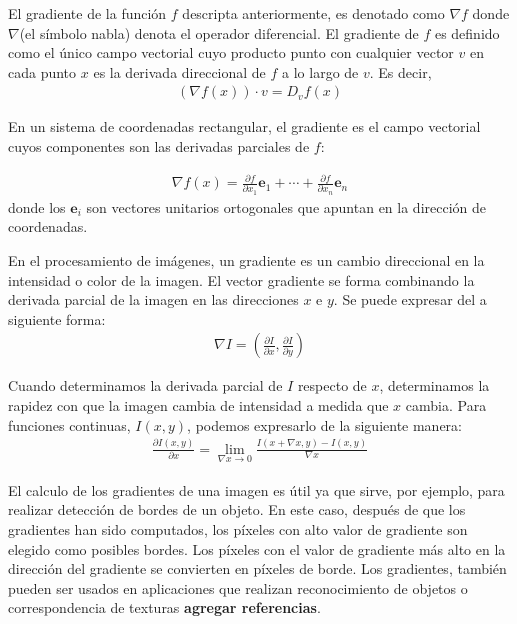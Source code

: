 	El gradiente de la función $f$ descripta anteriormente, es denotado como $\nabla f$ donde $\nabla$(el símbolo nabla) denota el operador diferencial. El gradiente de $f$ es definido como el único campo vectorial cuyo producto punto con cualquier vector $v$ en cada punto $x$ es la derivada direccional de $f$ a lo largo de $v$. Es decir,
		 \begin{align*}
		 	(\nabla f(x))\cdot v = D_v f(x)
		 \end{align*}
		 
	En un sistema de coordenadas rectangular, el gradiente es el campo vectorial cuyos componentes son las derivadas parciales de $f$:
		 
		 \begin{align*}
		 	\nabla f(x) = \frac{\partial f}{\partial x_1}\mathbf{e}_1 + \cdots + \frac{\partial f}{\partial x_n }\mathbf{e}_n
		 \end{align*}
	donde los $\mathbf{e}_i$ son vectores unitarios ortogonales que apuntan en la dirección de coordenadas.

	En el procesamiento de imágenes, un gradiente es un cambio direccional en la intensidad o color de la imagen. El vector gradiente se forma combinando la derivada parcial de la imagen en las direcciones $x$ e $y$. Se puede expresar del a siguiente forma:
		\begin{align}
			\nabla I = \left( \frac{\partial I}{\partial x} , \frac{\partial I}{\partial y} \right)
		\end{align}	
		
	Cuando determinamos la derivada parcial de $I$ respecto de $x$, determinamos la rapidez con que la imagen cambia de intensidad a medida que $x$ cambia. Para funciones continuas, $I(x,y)$, podemos expresarlo de la siguiente manera:
	\begin{align}
		\frac{\partial I(x,y)}{\partial x} = \lim_{\nabla x\rightarrow 0} \frac{I(x + \nabla x, y) - I(x,y)}{\nabla x}	
	\end{align}
	
	 El calculo de los gradientes de una imagen es útil ya que sirve, por ejemplo, para realizar detección de bordes de un objeto. En este caso, después de que los gradientes han sido computados, los píxeles con alto valor de gradiente son elegido como posibles bordes. Los píxeles con el valor de gradiente más alto en la dirección del gradiente se convierten en píxeles de borde. Los gradientes, también pueden ser usados en aplicaciones que realizan reconocimiento de objetos o correspondencia de texturas \textbf{agregar referencias}.
